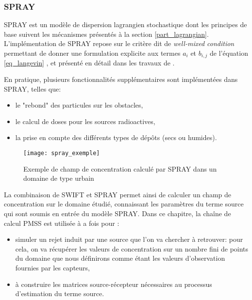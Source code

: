 \subsubsection{SPRAY}

SPRAY est un modèle de dispersion lagrangien stochastique dont les principes de base suivent les mécanismes présentés à la section \ref{part_lagrangian}. L'implémentation de SPRAY repose sur le critère dit de \textit{well-mixed condition} permettant de donner une formulation explicite aux termes $a_i$ et $b_{i,j}$ de l'équation \eqref{eq_langevin} , et présenté en détail dans les travaux de \cite{Thomson1987}.

En pratique, plusieurs fonctionnalités supplémentaires sont implémentées dans SPRAY, telles que: \\

\begin{itemize}
	\item le "rebond" des particules sur les obstacles,
	\item le calcul de doses pour les sources radioactives,
	\item la prise en compte des différents types de dépôts (secs ou humides).\\
\end{itemize}

\begin{figure}[h!]
	\centering
	\texttt{[image: spray\_exemple]}
	\caption{Exemple de champ de concentration calculé par SPRAY dans un domaine de type urbain}
	\label{fig_spray_exemple}
\end{figure}

La combinaison de SWIFT et SPRAY permet ainsi de calculer un champ de concentration sur le domaine étudié, connaissant les paramètres du terme source qui sont soumis en entrée du modèle SPRAY. Dans ce chapitre, la chaîne de calcul PMSS est utilisée à a fois pour : \\

\begin{itemize}
	\item simuler un rejet induit par une source que l'on va chercher à retrouver: pour cela, on va récupérer les valeurs de concentration sur un nombre fini de points du domaine que nous définirons comme étant les valeurs d'observation fournies par les capteurs,
	\item à construire les matrices source-récepteur nécessaires au processus d'estimation du terme source.\\
\end{itemize}

